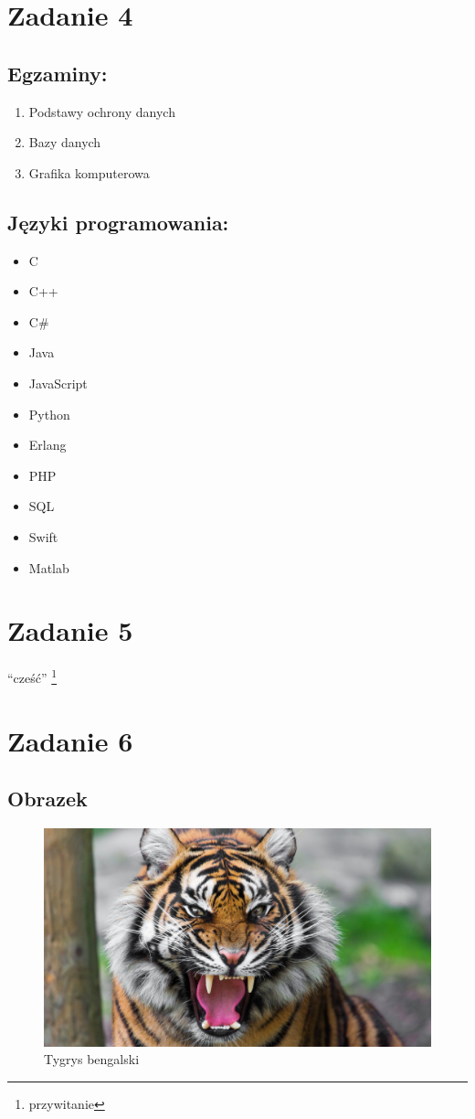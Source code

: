\documentclass{article}
\begin{document}
\section{Zadanie 4}
\subsection{Egzaminy: }
\begin{enumerate}[label=(\alph*)]
\item Podstawy ochrony danych
\item Bazy danych
\item Grafika komputerowa
\end{enumerate}
\subsection{Języki programowania: }
\begin{itemize}
\item C
\item C++
\item C\#
\item Java
\item JavaScript
\item Python
\item Erlang
\item PHP
\item SQL
\item Swift
\item Matlab
\end{itemize}

\section{Zadanie 5}
\enquote{cześć} \footnote{przywitanie}
\newpage 

\section{Zadanie 6}
\subsection{Obrazek}
\begin{figure}[ht!]
\label{fig:tiger}
\centering
\includegraphics[scale=0.2]{tiger.jpg}
\caption{Tygrys bengalski}
\end{figure}
\end{document}
